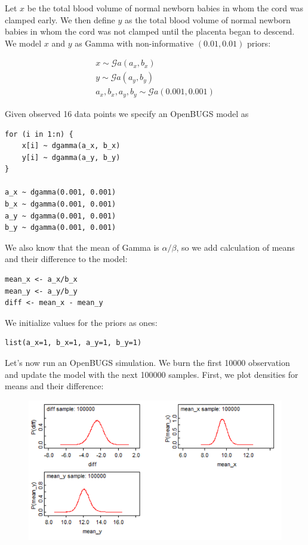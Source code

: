\documentclass[a4 paper]{article}
\begin{document}
	




Let $x$ be the total blood volume
of normal newborn babies in
whom the cord was clamped early. We
then define $y$ as the total blood volume
of normal newborn babies in whom the cord 
was not clamped until the placenta 
began to descend. We model $x$ and $y$ as
Gamma with non-informative $(0.01, 0.01)$
priors:

\begin{align*}
x	\sim\mathcal{G}a\left(a_{x},b_{x}\right) \\
y	\sim\mathcal{G}a\left(a_{y},b_{y}\right) \\
a_{x},b_{x},a_{y},b_{y}	\sim\mathcal{G}a\left(0.001,0.001\right)
\end{align*}

Given observed 16 data points we 
specify an OpenBUGS model as

\begin{Verbatim}
for (i in 1:n) {
	x[i] ~ dgamma(a_x, b_x)
	y[i] ~ dgamma(a_y, b_y)
}
	
a_x ~ dgamma(0.001, 0.001)
b_x ~ dgamma(0.001, 0.001)
a_y ~ dgamma(0.001, 0.001)
b_y ~ dgamma(0.001, 0.001)
\end{Verbatim} 

We also know that the mean of Gamma is $\alpha/\beta$,
so we add calculation of means and their difference
to the model:

\begin{Verbatim}
mean_x <- a_x/b_x
mean_y <- a_y/b_y
diff <- mean_x - mean_y
\end{Verbatim} 

We initialize values for the priors as ones:
\begin{Verbatim}
list(a_x=1, b_x=1, a_y=1, b_y=1)  
\end{Verbatim} 



Let's now run an OpenBUGS simulation. We burn
the first 10000 observation and update the model 
with the next 100000 samples. First, we plot 
densities for means and their difference:

\begin{figure}[H]
	\includegraphics[scale=1.0]{q1}
	\centering
	\label{q1}
\end{figure}
\end{document}
